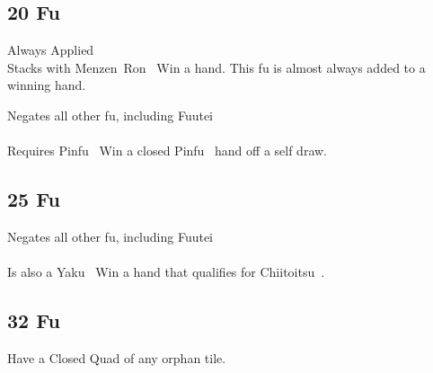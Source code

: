 \subsection{20 Fu}\label{core:ssec:20-fu}

	{\symbalert Always Applied \\
	\upgradesto Stacks with Menzen~Ron~}
	{Win a hand. This fu is almost always added to a winning hand.}

	{\symbnegate Negates all other fu, including Fuutei~ \\
	\closedhand \\
	\upgradesfromother Requires Pinfu~}
	{Win a closed Pinfu~ hand off a self draw.}


\subsection{25 Fu}\label{core:ssec:25-fu}

	{\symbnegate Negates all other fu, including Fuutei~ \\
	\closedhand \\
	\upgradesfromother Is also a Yaku~}
	{Win a hand that qualifies for Chiitoitsu~.}


\subsection{32 Fu}\label{core:ssec:32-fu}

	{}
	{Have a Closed Quad of any orphan tile.}